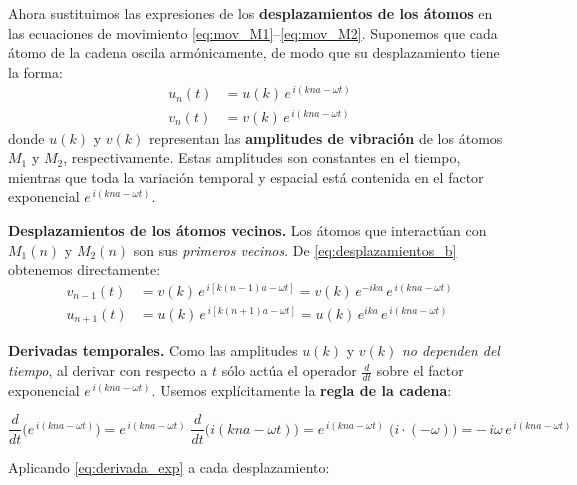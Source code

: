 \documentclass{article}
\begin{document}
\;

Ahora sustituimos las expresiones de los \textbf{desplazamientos de los átomos} en las ecuaciones de movimiento \eqref{eq:mov_M1}–\eqref{eq:mov_M2}.  
Suponemos que cada átomo de la cadena oscila armónicamente, de modo que su desplazamiento tiene la forma:
\begin{equation}
\begin{split}
u_{n}(t) &= u(k)\,e^{\,i(kna-\omega t)}\\
v_{n}(t) &= v(k)\,e^{\,i(kna-\omega t)}
\end{split}
\label{eq:desplazamientos_b}
\end{equation}
donde \(u(k)\) y \(v(k)\) representan las \textbf{amplitudes de vibración} de los átomos \(M_{1}\) y \(M_{2}\), respectivamente.  
Estas amplitudes son constantes en el tiempo, mientras que toda la variación temporal y espacial está contenida en el factor exponencial \(e^{\,i(kna-\omega t)}\).

\vspace{0.4cm}
\textcolor{trueblue}{\textbf{Desplazamientos de los átomos vecinos.}}  
Los átomos que interactúan con \(M_{1}(n)\) y \(M_{2}(n)\) son sus \emph{primeros vecinos}.  
De \eqref{eq:desplazamientos_b} obtenemos directamente:
\begin{equation}
\begin{split}
v_{n-1}(t) &= v(k)\,e^{\,i[k(n-1)a-\omega t]} = v(k)\,e^{-ika}\,e^{\,i(kna-\omega t)}\\
u_{n+1}(t) &= u(k)\,e^{\,i[k(n+1)a-\omega t]} = u(k)\,e^{ika}\,e^{\,i(kna-\omega t)}
\end{split}
\label{eq:vecinos_b}
\end{equation}

\vspace{0.4cm}
\textcolor{trueblue}{\textbf{Derivadas temporales.}}  
Como las amplitudes \(u(k)\) y \(v(k)\) \emph{no dependen del tiempo}, al derivar con respecto a \(t\) sólo actúa el operador
\(\frac{d}{dt}\) sobre el factor exponencial \(e^{\,i(kna-\omega t)}\). Usemos explícitamente la \textbf{regla de la cadena}:

\begin{equation}
\frac{d}{dt}\Big(e^{\,i(kna-\omega t)}\Big)
= e^{\,i(kna-\omega t)}\;\frac{d}{dt}\big(i(kna-\omega t)\big)
= e^{\,i(kna-\omega t)}\;\big(i\cdot(-\omega)\big)
= -\,i\omega\,e^{\,i(kna-\omega t)}
\label{eq:derivada_exp}
\end{equation}

Aplicando \eqref{eq:derivada_exp} a cada desplazamiento:
\end{document}
